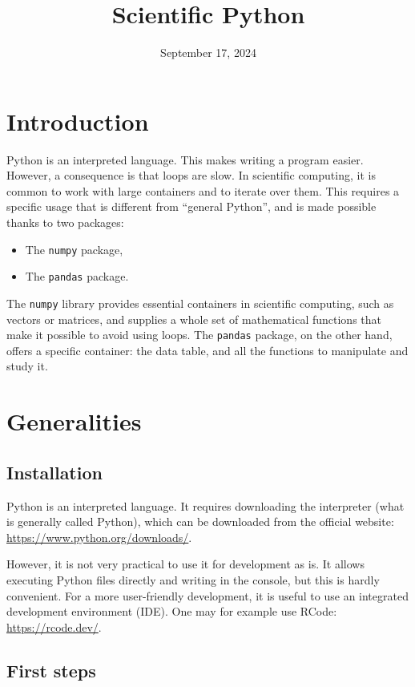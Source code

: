 \documentclass[11pt]{article}
\title{Scientific Python}
\date{September 17, 2024}
\begin{document}
\maketitle
\tableofcontents

\section*{Introduction}

Python is an interpreted language. This makes writing a program easier. However, a consequence is that loops are slow. In scientific computing, it is common to work with large containers and to iterate over them. This requires a specific usage that is different from ``general Python'', and is made possible thanks to two packages:
\begin{itemize}
\item The \texttt{numpy} package,
\item The \texttt{pandas} package.
\end{itemize}

The \texttt{numpy} library provides essential containers in scientific computing, such as vectors or matrices, and supplies a whole set of mathematical functions that make it possible to avoid using loops. The \texttt{pandas} package, on the other hand, offers a specific container: the data table, and all the functions to manipulate and study it.

\section{Generalities}

\subsection{Installation}

Python is an interpreted language. It requires downloading the interpreter (what is generally called Python), which can be downloaded from the official website:  
\url{https://www.python.org/downloads/}.

However, it is not very practical to use it for development as is. It allows executing Python files directly and writing in the console, but this is hardly convenient. For a more user-friendly development, it is useful to use an integrated development environment (IDE). One may for example use RCode:  
\url{https://rcode.dev/}.

\subsection{First steps}
\end{document}
